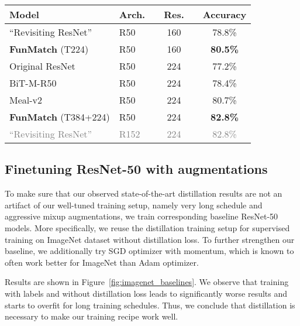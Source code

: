 \documentclass[10pt,twocolumn,letterpaper]{article}
\begin{document}
\begin{table}[t]
  \setlength{\tabcolsep}{0pt}
  \setlength{\extrarowheight}{5pt}
  \renewcommand{\arraystretch}{0.75}
  \centering
{}\label{tbl:sota}
  \begin{tabularx}{\linewidth}{p{4.0cm}p{0.8cm}p{0.4cm}cp{0.4cm}c}
    \toprule[1pt]
    \textbf{Model} & Arch. && Res. && Accuracy \\
    \bottomrule
    ``Revisiting ResNet''~\cite{bello2021revisiting} & R50 && 160  && 78.8\%  \\
    \textbf{FunMatch} (T224) & R50 && 160 && \textbf{80.5\%}  \\
    \midrule
    Original ResNet~\cite{he2016deep} & R50  && 224  && 77.2\%  \\
    BiT-M-R50~\cite{brain2020bit} & R50  && 224  && 78.4\%  \\
    Meal-v2~\cite{shen2020mealv2} & R50  && 224  && 80.7\%  \\
\textbf{FunMatch} (T384+224) & R50 && 224  && \textbf{82.8\%}  \\
    \midrule
    \textcolor{gray}{``Revisiting ResNet''~\cite{bello2021revisiting}} & \textcolor{gray}{R152} && \textcolor{gray}{224} && \textcolor{gray}{82.8\%}  \\
    \bottomrule
  \end{tabularx}
\end{table}


\subsection{Finetuning ResNet-50 with augmentations} 

To make sure that our observed state-of-the-art distillation results are not an artifact of our well-tuned training setup, namely very long schedule and aggressive mixup augmentations, we train corresponding baseline ResNet-50 models. More specifically, we reuse the distillation training setup for supervised training on ImageNet dataset without distillation loss. To further strengthen our baseline, we additionally try SGD optimizer with momentum, which is known to often work better for ImageNet than Adam optimizer.

Results are shown in Figure~\ref{fig:imagenet_baselines}. We observe that training with labels and without distillation loss leads to significantly worse results and starts to overfit for long training schedules. Thus, we conclude that distillation is necessary to make our training recipe work well.
\end{document}
